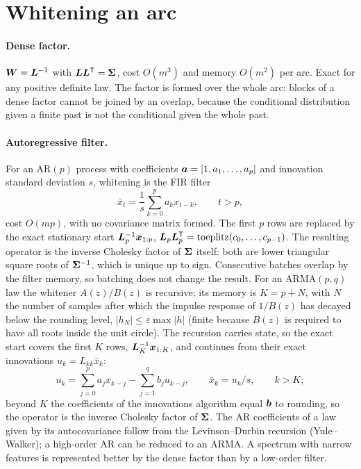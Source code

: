 \section{Whitening an arc}\label{sec:whitening}

\paragraph{Dense factor.} $\bm{W}=\bm{L}^{-1}$ with $\bm{L}\bm{L}^{\mathsf T}=\bm{\Sigma}$, cost $O(m^3)$ and
memory $O(m^2)$ per arc. Exact for any positive definite law. The factor is formed over the whole
arc: blocks of a dense factor cannot be joined by an overlap, because the conditional distribution
given a finite past is not the conditional given the whole past.

\paragraph{Autoregressive filter.} For an AR$(p)$ process with coefficients
$\bm{a}=[1,a_1,\dots,a_p]$ and innovation standard deviation $s$, whitening is the FIR filter
\begin{equation}\label{eq:arfilter}
\bar x_t=\frac1s\sum_{k=0}^p a_kx_{t-k},\qquad t>p,
\end{equation}
cost $O(mp)$, with no covariance matrix formed. The first $p$ rows are replaced by the exact
stationary start $\bm{L}_p^{-1}\bm{x}_{1:p}$, $\bm{L}_p\bm{L}_p^{\mathsf T}=\operatorname{toeplitz}(c_0,\dots,c_{p-1})$.
The resulting operator is the inverse Cholesky factor of $\bm{\Sigma}$ itself: both are lower
triangular square roots of $\bm{\Sigma}^{-1}$, which is unique up to sign. Consecutive batches
overlap by the filter memory, so batching does not change the result. For an ARMA$(p,q)$ law the
whitener $A(z)/B(z)$ is recursive; its memory is $K=p+N$, with $N$ the number of samples after
which the impulse response of $1/B(z)$ has decayed below the rounding level,
$|h_N|\le\varepsilon\max|h|$ (finite because $B(z)$ is required to have all roots inside the
unit circle). The recursion carries state, so the exact start covers the first $K$ rows,
$\bm{L}_K^{-1}\bm{x}_{1:K}$, and continues from their exact innovations
$u_k=L_{kk}\bar x_k$:
\begin{equation}
u_k=\sum_{j=0}^p a_jx_{k-j}-\sum_{j=1}^q b_ju_{k-j},\qquad \bar x_k=u_k/s,\qquad k>K;
\end{equation}
beyond $K$ the coefficients of the innovations algorithm equal $\bm{b}$ to rounding, so the
operator is the inverse Cholesky factor of $\bm{\Sigma}$. The AR coefficients of a
law given by its autocovariance follow from the Levinson--Durbin recursion (Yule--Walker); a
high-order AR can be reduced to an ARMA. A spectrum with narrow features is represented better by
the dense factor than by a low-order filter.

